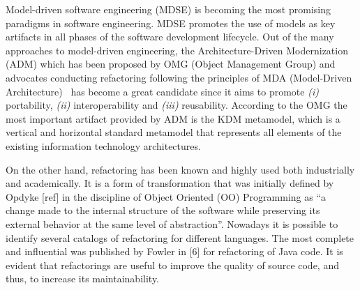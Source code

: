 Model-driven software engineering (MDSE) is becoming the most promising paradigms in software engineering. MDSE promotes the use of models as key artifacts in all phases of the software development lifecycle. Out of the many approaches to model-driven engineering, the Architecture-Driven Modernization (ADM) which has been proposed by OMG (Object Management Group) and advocates conducting refactoring following the principles of MDA (Model-Driven Architecture)~\cite{Ulrich:2010:IST:1841736} has become a great candidate since it aims to promote \textit{(i)} portability, \textit{(ii)} interoperability and \textit{(iii)} reusability. According to the OMG the most important artifact provided by ADM is the KDM metamodel, which is a vertical and horizontal standard metamodel that represents all elements of the existing information  technology architectures. %


On the other hand, refactoring has been known and highly used both industrially and academically. It is a form of transformation that was initially defined by Opdyke [ref] in the discipline of Object Oriented (OO) Programming as ``a change made to the internal structure of the software while preserving its external behavior at the same level of abstraction''. Nowadays it is possible to identify several catalogs of refactoring for different languages. The most complete and influential was published by Fowler in [6] for refactoring of Java code. It is evident that refactorings are useful to improve the quality of source code, and thus, to increase its maintainability. 

